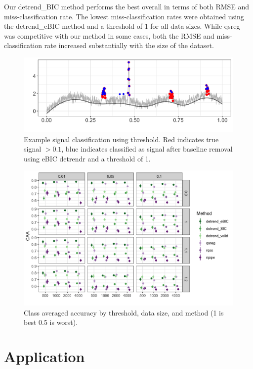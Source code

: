 \documentclass[12pt]{article}
\begin{document}
	
	Our detrend\_BIC method performs the best overall in terms of both RMSE and miss-classification rate. The lowest miss-classification rates were obtained using the detrend\_eBIC method and a threshold of 1 for all data sizes. While qsreg was competitive with our method in some cases, both the RMSE and miss-classification rate increased substantially with the size of the dataset. 
	
	\begin{figure}[h!]
		\caption{Example signal classification using threshold. Red indicates true signal $>0.1$, blue indicates classified as signal after baseline removal using eBIC detrendr and a threshold of 1.}
		\includegraphics[width = \linewidth]{Figures/peaks_eg_class.png}
	\end{figure}
	

	\begin{figure}[h!]
		\caption{Class averaged accuracy by threshold, data size, and method (1 is best 0.5 is worst).}
		\includegraphics[width = \linewidth]{Figures/peaks_CAA.png}
	\end{figure}


	\FloatBarrier
	
	\section{Application}
	
\end{document}
